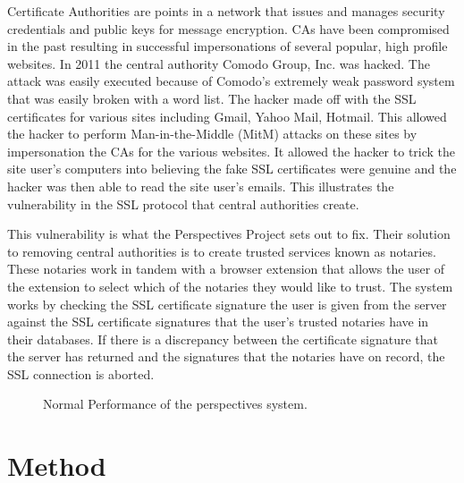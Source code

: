 \documentclass[preprint,review,12pt]{elsarticle}
\begin{document}
Certificate Authorities are points in a network that issues and manages
security credentials and public keys for message encryption. CAs have been 
compromised in the past resulting in successful impersonations
of several popular, high profile websites.  In 2011 the central authority
Comodo Group, Inc. was hacked. The attack was easily executed
because of Comodo's extremely weak password system that was easily broken with a word
list. The hacker made off with the SSL certificates for various sites including 
Gmail, Yahoo Mail, Hotmail.  \citep{comodohack}
This allowed the hacker to perform Man-in-the-Middle (MitM) attacks on these sites by
impersonation the CAs for the various websites. It allowed the hacker to trick the site
user's computers into believing the fake SSL certificates were genuine and the hacker was
then able to read the site user's emails.  This illustrates the vulnerability
in the SSL protocol that central authorities create.

This vulnerability is what the Perspectives Project sets out to fix. Their
solution to removing central authorities is to create trusted services known as
notaries. These notaries work in tandem with a browser extension that allows the
user of the extension to select which of the notaries they would like to
trust. The system works by checking the SSL certificate signature the user is
given from the server against the SSL certificate signatures that the user's
trusted notaries have in their databases. If there is a discrepancy between the
certificate signature that the server has returned and the signatures that the
notaries have on record, the SSL connection is aborted.

\begin{figure}[h]
\caption{Normal Performance of the perspectives system.}
\end{figure}

\section{Method}
\label{Method}
\end{document}
